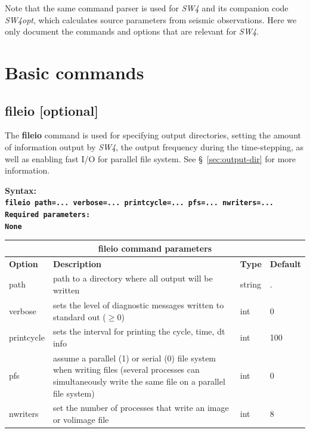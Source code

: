 \documentclass[11pt]{report}
\begin{document}
Note that the same command parser is used for \emph{SW4} and its companion code \emph{SW4opt}, which
calculates source parameters from seismic observations. Here we only document the commands and options
that are relevant for \emph{SW4}.

\section{Basic commands}

\subsection{fileio [optional]}
The {\bf fileio} command is used for specifying output directories, setting the amount of
information output by \emph{SW4}, the output frequency during the time-stepping, as well
as enabling fast I/O for parallel file system. See \S~\ref{sec:output-dir} for more information.
\begin{flushleft}\bf
Syntax:\\ \tt fileio path=... verbose=... printcycle=... pfs=... nwriters=... \\ 
\bf Required parameters:\\ 
\rm None
\end{flushleft}
\begin{center}
\begin{tabular}{|l|p{8cm}|l|l|} \hline
\multicolumn{4}{|c|}{\bf fileio command parameters}\\ \hline
\bf{Option} & \bf{Description} & \bf{Type} & \bf{Default} \\ \hline \hline
path        & path to a directory where all output will be written & string & . \\ \hline
verbose	    & sets the level of diagnostic messages written to standard out ($\geq 0$) & int & 0  \\ \hline
printcycle  & sets the interval for printing the cycle, time, dt info & int & 100 \\ \hline
pfs         & assume a parallel (1) or serial (0) file system when writing files (several
processes can simultaneously write the same file on a parallel file system) & int & 0 \\ \hline
nwriters    & set the number of processes that write an image or volimage file & int & 8 \\ \hline
\end{tabular}
\end{center}
\end{document}
